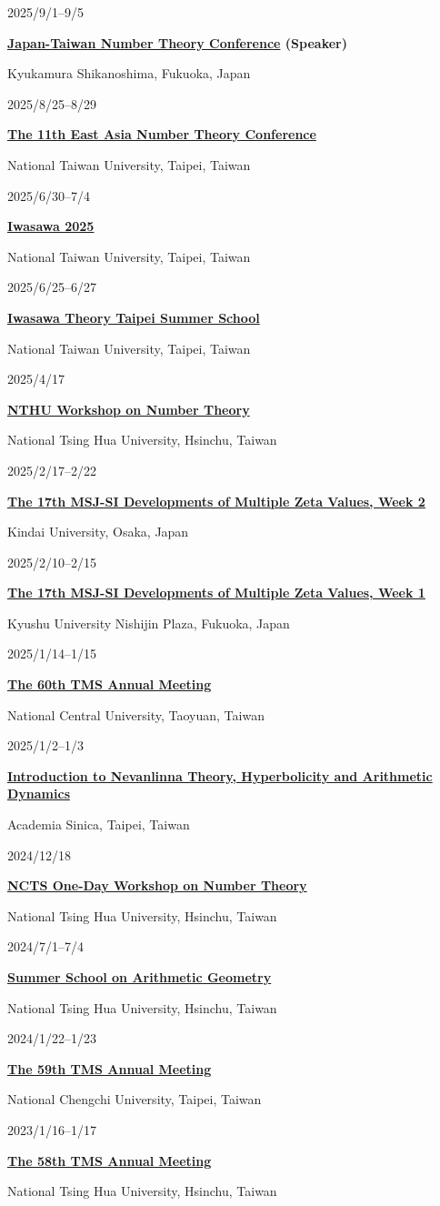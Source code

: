 \documentclass[10pt,a4paper]{article}
\newlength{\cvDateWidth}
\newlength{\cvDateGap}
\newcommand{\cvdated}[3]{%
  \needspace{2.3\baselineskip}%
  \noindent\begin{minipage}[t]{\cvDateWidth}
     \vspace{0pt}\strut{\small\color{cvMuted}#1}%
  \end{minipage}%
  \hspace{\cvDateGap}%
  \begin{minipage}[t]{\dimexpr\linewidth-\cvDateWidth-\cvDateGap\relax}
     \vspace{0pt}\strut{\bfseries #2}\par\noindent #3%
  \end{minipage}\par\vspace{.22em}%
}
\begin{document}
\cvdated{2025/9/1--9/5}{\href{https://www.cck.dendai.ac.jp/math/~namikawa/2025JapanTaiwan/2025JapanTaiwan.html}{Japan-Taiwan Number Theory Conference} {\normalfont\color{cvAccentDark}(Speaker)}}{Kyukamura Shikanoshima, Fukuoka, Japan}
\cvdated{2025/8/25--8/29}{\href{https://www.math.ntnu.edu.tw/workshop/eantc2025/}{The 11th East Asia Number Theory Conference}}{National Taiwan University, Taipei, Taiwan}
\cvdated{2025/6/30--7/4}{\href{https://sites.google.com/ncts.ntu.edu.tw/iwasawa-2025/iwasawa-2025?authuser=0}{Iwasawa 2025}}{National Taiwan University, Taipei, Taiwan}
\cvdated{2025/6/25--6/27}{\href{https://sites.google.com/ncts.ntu.edu.tw/iwasawa-summerschool/}{Iwasawa Theory Taipei Summer School}}{National Taiwan University, Taipei, Taiwan}
\cvdated{2025/4/17}{\href{https://www.math.nthu.edu.tw/download.php?dir=seminar_event\&filename=19eeb11766f7313f8b3696d3069dd8e7.pdf\&title=2025.04.17}{NTHU Workshop on Number Theory}}{National Tsing Hua University, Hsinchu, Taiwan}
\cvdated{2025/2/17--2/22}{\href{https://www.apu.ac.jp/~rintaro/MK60/indexE.html}{The 17th MSJ-SI Developments of Multiple Zeta Values, Week 2}}{Kindai University, Osaka, Japan}
\cvdated{2025/2/10--2/15}{\href{https://sites.google.com/view/the-17th-msj-siw1}{The 17th MSJ-SI Developments of Multiple Zeta Values, Week 1}}{Kyushu University Nishijin Plaza, Fukuoka, Japan}
\cvdated{2025/1/14--1/15}{\href{https://2025tms-en.tms.org.tw/}{The 60th TMS Annual Meeting}}{National Central University, Taoyuan, Taiwan}
\cvdated{2025/1/2--1/3}{\href{https://idv.sinica.edu.tw/mathas/202501SCV/index.html}{Introduction to Nevanlinna Theory, Hyperbolicity and Arithmetic Dynamics}}{Academia Sinica, Taipei, Taiwan}
\cvdated{2024/12/18}{\href{https://ncts.ntu.edu.tw/news/Events/conferences/5826}{NCTS One-Day Workshop on Number Theory}}{National Tsing Hua University, Hsinchu, Taiwan}
\cvdated{2024/7/1--7/4}{\href{https://ncts.ntu.edu.tw/news/Events/courses/6148}{Summer School on Arithmetic Geometry}}{National Tsing Hua University, Hsinchu, Taiwan}
\cvdated{2024/1/22--1/23}{\href{https://2024tms.tms.org.tw/}{The 59th TMS Annual Meeting}}{National Chengchi University, Taipei, Taiwan}
\cvdated{2023/1/16--1/17}{\href{https://www.math.nthu.edu.tw/~2022TMS/home_en.html}{The 58th TMS Annual Meeting}}{National Tsing Hua University, Hsinchu, Taiwan}
\end{document}
